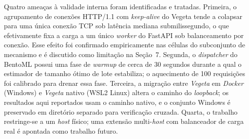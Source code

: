 Quatro ameaças à validade interna foram identificadas e tratadas. Primeira,
o agrupamento de conexões HTTP/1.1 com \textit{keep-alive} do Vegeta tende
a colapsar para uma única conexão TCP sob latência mediana submilissegundo,
o que efetivamente fixa a carga a um único \textit{worker} do FastAPI sob
balanceamento por conexão. Esse efeito foi confirmado empiricamente nas
células do subconjunto de mecanismo e é discutido como limitação na
Seção~7. Segunda, o \textit{dispatcher} do BentoML possui uma fase de
\textit{warmup} de cerca de 30 segundos durante a qual o estimador de
tamanho ótimo de lote estabiliza; o aquecimento de 100 requisições foi
calibrado para drenar essa fase. Terceira, a migração entre \textit{Vegeta}
em \textit{Docker} (Windows) e \textit{Vegeta} nativo (WSL2 Linux) altera o
caminho do \textit{loopback}; os resultados aqui reportados usam o caminho
nativo, e o conjunto Windows é preservado em diretório separado para
verificação cruzada. Quarta, o trabalho restringe-se a um \textit{host}
físico; uma extensão multi-\textit{host} com balanceador de carga real é
apontada como trabalho futuro.

